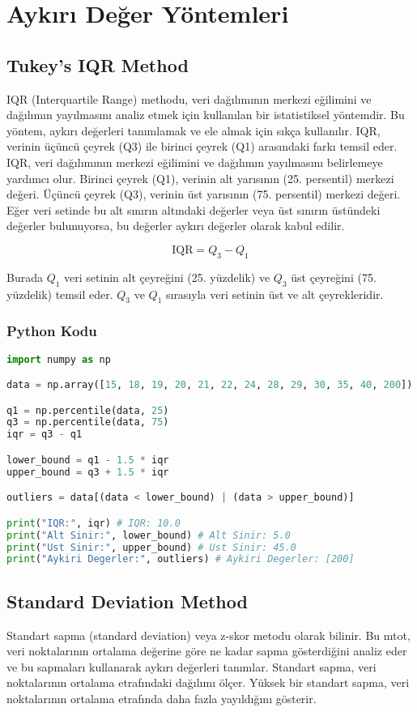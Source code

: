 \section{Aykırı Değer Yöntemleri}

\subsection{Tukey's IQR Method}
IQR (Interquartile Range) methodu, veri dağılımının merkezi eğilimini ve dağılımın yayılmasını analiz etmek için kullanılan bir istatistiksel yöntemdir. Bu yöntem, aykırı değerleri tanımlamak ve ele almak için sıkça kullanılır. IQR, verinin üçüncü çeyrek (Q3) ile birinci çeyrek (Q1) arasındaki farkı temsil eder. IQR, veri dağılımının merkezi eğilimini ve dağılımın yayılmasını belirlemeye yardımcı olur. Birinci çeyrek (Q1), verinin alt yarısının (25. persentil) merkezi değeri. Üçüncü çeyrek (Q3), verinin üst yarısının (75. persentil) merkezi değeri. Eğer veri setinde bu alt sınırın altındaki değerler veya üst sınırın üstündeki değerler bulunuyorsa, bu değerler aykırı değerler olarak kabul edilir.

\[ \text{IQR} = Q_3 - Q_1 \]

Burada $Q_1$ veri setinin alt çeyreğini (25. yüzdelik) ve $Q_3$ üst çeyreğini (75. yüzdelik) temsil eder. $Q_3$ ve $Q_1$ sırasıyla veri setinin üst ve alt çeyrekleridir.

\subsubsection{Python Kodu}

\begin{lstlisting}[language=Python]
import numpy as np

data = np.array([15, 18, 19, 20, 21, 22, 24, 28, 29, 30, 35, 40, 200])

q1 = np.percentile(data, 25)
q3 = np.percentile(data, 75)
iqr = q3 - q1

lower_bound = q1 - 1.5 * iqr
upper_bound = q3 + 1.5 * iqr

outliers = data[(data < lower_bound) | (data > upper_bound)]

print("IQR:", iqr) # IQR: 10.0
print("Alt Sinir:", lower_bound) # Alt Sinir: 5.0
print("Ust Sinir:", upper_bound) # Ust Sinir: 45.0
print("Aykiri Degerler:", outliers) # Aykiri Degerler: [200]
\end{lstlisting}

\newpage

\subsection{Standard Deviation Method}
Standart sapma (standard deviation) veya z-skor metodu olarak bilinir. Bu mtot, veri noktalarının ortalama değerine göre ne kadar sapma gösterdiğini analiz eder ve bu sapmaları kullanarak aykırı değerleri tanımlar. Standart sapma, veri noktalarının ortalama etrafındaki dağılımı ölçer. Yüksek bir standart sapma, veri noktalarının ortalama etrafında daha fazla yayıldığını gösterir.

